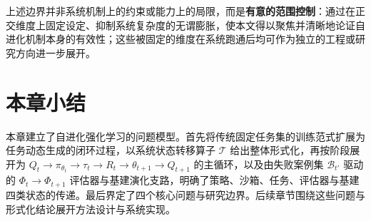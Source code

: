 上述边界并非系统机制上的约束或能力上的局限，而是\textbf{有意的范围控制}：通过在正交维度上固定设定、抑制系统复杂度的无谓膨胀，使本文得以聚焦并清晰地论证自进化机制本身的有效性；这些被固定的维度在系统跑通后均可作为独立的工程或研究方向进一步展开。

\section{本章小结}

本章建立了自进化强化学习的问题模型。首先将传统固定任务集的训练范式扩展为任务动态生成的闭环过程，以系统状态转移算子 $\mathcal{T}$ 给出整体形式化，再按阶段展开为 $Q_t \to \pi_{\theta_t} \to \tau_t \to R_t \to \theta_{t+1} \to Q_{t+1}$ 的主循环，以及由失败案例集 $\mathcal{B}_{t'}$ 驱动的 $\Phi_t \to \Phi_{t+1}$ 评估器与基建演化支路，明确了策略、沙箱、任务、评估器与基建四类状态的传递。最后界定了四个核心问题与研究边界。后续章节围绕这些问题与形式化结论展开方法设计与系统实现。
